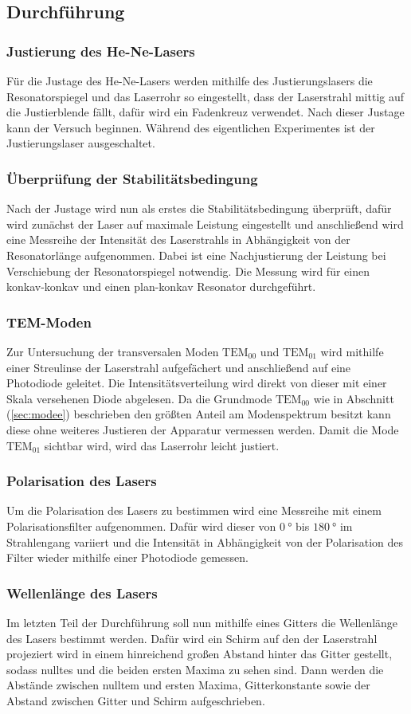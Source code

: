 \subsection{Durchführung}
\subsubsection{Justierung des He-Ne-Lasers}
Für die Justage des He-Ne-Lasers werden mithilfe des Justierungslasers die Resonatorspiegel und das Laserrohr so eingestellt, dass der Laserstrahl mittig auf die Justierblende fällt, dafür wird ein Fadenkreuz verwendet.
Nach dieser Justage kann der Versuch beginnen. Während des eigentlichen Experimentes ist der Justierungslaser ausgeschaltet.
\subsubsection{Überprüfung der Stabilitätsbedingung}
Nach der Justage wird nun als erstes die Stabilitätsbedingung überprüft, dafür wird zunächst der Laser auf maximale Leistung eingestellt und anschließend wird eine Messreihe der Intensität des Laserstrahls in Abhängigkeit von
der Resonatorlänge aufgenommen. Dabei ist eine Nachjustierung der Leistung bei Verschiebung der Resonatorspiegel notwendig. Die Messung wird für einen konkav-konkav und einen plan-konkav Resonator durchgeführt.
\subsubsection{TEM-Moden}
Zur Untersuchung der transversalen Moden $\mathrm{TEM}_\mathrm{00}$ und $\mathrm{TEM}_\mathrm{01}$ wird mithilfe einer Streulinse der Laserstrahl aufgefächert und anschließend auf eine Photodiode geleitet.
Die Intensitätsverteilung wird direkt von dieser mit einer Skala versehenen Diode abgelesen. Da die Grundmode $\mathrm{TEM}_\mathrm{00}$ wie in Abschnitt (\ref{sec:modee}) beschrieben den größten Anteil am Modenspektrum besitzt kann
diese ohne weiteres Justieren der Apparatur vermessen werden. Damit die Mode $\mathrm{TEM}_\mathrm{01}$ sichtbar wird, wird das Laserrohr leicht justiert.
\subsubsection{Polarisation des Lasers}
\label{sec:polari}
Um die Polarisation des Lasers zu bestimmen wird eine Messreihe mit einem Polarisationsfilter aufgenommen. Dafür wird dieser von $\SI{0}{\degree}$ bis $\SI{180}{\degree}$ im Strahlengang variiert und die Intensität in Abhängigkeit von der Polarisation des Filter wieder mithilfe einer Photodiode gemessen.
\subsubsection{Wellenlänge des Lasers}
Im letzten Teil der Durchführung soll nun mithilfe eines Gitters die Wellenlänge des Lasers bestimmt werden. Dafür wird ein Schirm auf den der Laserstrahl projeziert wird in einem hinreichend großen Abstand hinter das Gitter gestellt, sodass nulltes und die beiden ersten Maxima zu sehen sind. Dann werden die Abstände zwischen nulltem und ersten Maxima, Gitterkonstante sowie der Abstand zwischen Gitter und Schirm aufgeschrieben.
